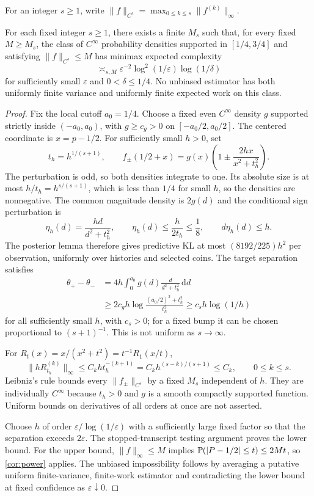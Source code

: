 For an integer $s\ge1$, write
$\|f\|_{C^s}=\max_{0\le k\le s}\|f^{(k)}\|_\infty$.

\begin{theorem}\label{thm:smooth}
For each fixed integer $s\ge1$, there exists a finite $M_s$ such that,
for every fixed $M\ge M_s$, the class of $C^\infty$ probability densities
supported in $[1/4,3/4]$ and satisfying $\|f\|_{C^s}\le M$ has minimax
expected complexity
\[
 \asymp_{s,M}\varepsilon^{-2}\log^2(1/\varepsilon)\log(1/\delta)
\]
for sufficiently small $\varepsilon$ and $0<\delta\le1/4$.
No unbiased estimator has both uniformly finite variance and uniformly
finite expected work on this class.
\end{theorem}
\begin{proof}
Fix the local cutoff $a_0=1/4$. Choose a fixed even $C^\infty$ density $g$ supported strictly inside
$(-a_0,a_0)$, with $g\ge c_g>0$ on $[-a_0/2,a_0/2]$. The centered coordinate is
$x=p-1/2$. For sufficiently small $h>0$, set
\begin{equation}\label{eq:smooth-pair}
 t_h=h^{1/(s+1)},\qquad
 f_\pm(1/2+x)=g(x)\left(1\pm\frac{2hx}{x^2+t_h^2}\right).
\end{equation}
The perturbation is odd, so both densities integrate to one. Its absolute
size is at most $h/t_h=h^{s/(s+1)}$, which is less than $1/4$ for small
$h$, so the densities are nonnegative. The common magnitude density is
$2g(d)$ and the conditional sign perturbation is
\[
 \eta_h(d)=\frac{hd}{d^2+t_h^2},\qquad
 \eta_h(d)\le\frac{h}{2t_h}\le\frac18,\qquad d\eta_h(d)\le h.
\]
The posterior lemma therefore gives predictive KL at most
$(8192/225)h^2$ per observation, uniformly over histories and selected coins.
The target separation satisfies
\begin{align*}
 \theta_+-\theta_-
 &=4h\int_0^{a_0} g(d)\frac{d}{d^2+t_h^2}\,\mathrm dd\\
 &\ge2c_g h\log\frac{(a_0/2)^2+t_h^2}{t_h^2}
 \ge c_s h\log(1/h)
\end{align*}
for all sufficiently small $h$, with $c_s>0$; for a fixed bump it can be chosen proportional to
$(s+1)^{-1}$. This is not uniform as $s\to\infty$.

For $R_t(x)=x/(x^2+t^2)=t^{-1}R_1(x/t)$,
\[
 \|hR_{t_h}^{(k)}\|_\infty
 \le C_k h t_h^{-(k+1)}
 =C_k h^{(s-k)/(s+1)}\le C_k,\qquad 0\le k\le s.
\]
Leibniz's rule bounds every $\|f_\pm\|_{C^s}$ by a fixed $M_s$ independent
of $h$. They are individually $C^\infty$ because $t_h>0$ and $g$ is a
smooth compactly supported function. Uniform bounds on derivatives of
all orders at once are not asserted.

Choose $h$ of order $\varepsilon/\log(1/\varepsilon)$ with a sufficiently
large fixed factor so that the separation exceeds $2\varepsilon$.
The stopped-transcript testing argument proves the lower bound. For the
upper bound, $\|f\|_\infty\le M$ implies
$\mathbb P(|P-1/2|\le t)\le2M t$, so \cref{cor:power} applies.
The unbiased impossibility follows by averaging a putative uniform
finite-variance, finite-work estimator and contradicting the lower bound
at fixed confidence as $\varepsilon\downarrow0$.
\end{proof}

